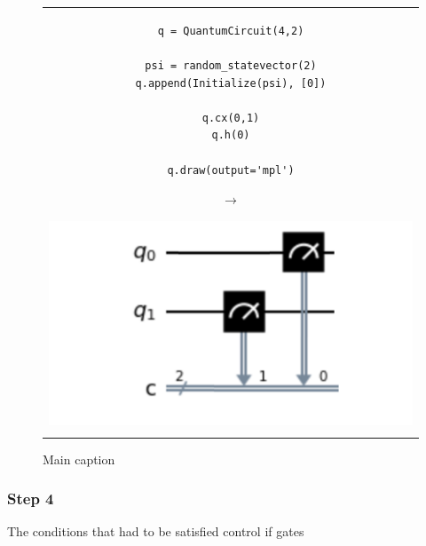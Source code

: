 \begin{figure}[h]
\centering
\begin{tabular}{c}
\begin{minipage}[c]{.45\linewidth}
\begin{verbatim}
q = QuantumCircuit(4,2)

psi = random_statevector(2)
q.append(Initialize(psi), [0])

q.cx(0,1)
q.h(0)

q.draw(output='mpl')
\end{verbatim}
\end{minipage}
\begin{minipage}[c]{.1\linewidth}
\centering
$\rightarrow$
\end{minipage}
\begin{minipage}[c]{.4\linewidth}
\centering
\includegraphics[width=\textwidth]{lab3/images/Step3.png}
\end{minipage}\\
\\ %
\end{tabular}
\caption{Main caption}
\label{step3}
\end{figure}

\subsubsection{Step 4}
The conditions that had to be satisfied
control if gates

